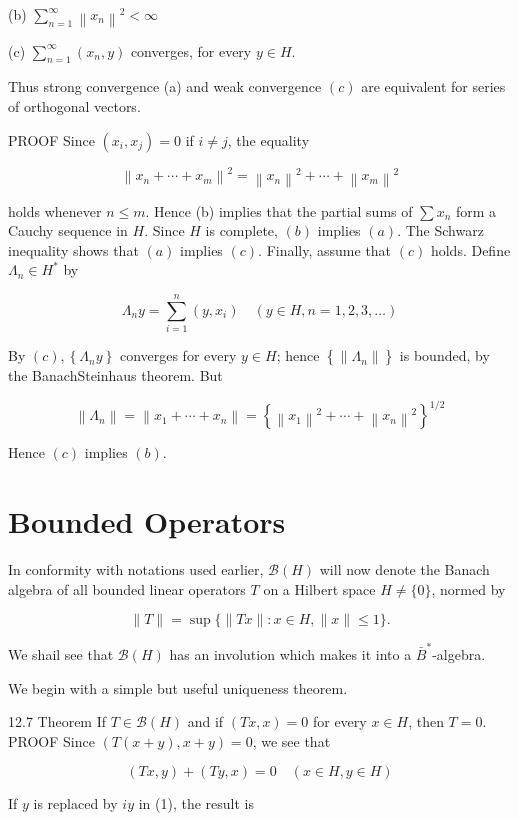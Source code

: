 \documentclass[10pt]{article}
\begin{document}
(b) $\sum_{n=1}^{\infty}\left\|x_{n}\right\|^{2}<\infty$

(c) $\sum_{n=1}^{\infty}\left(x_{n}, y\right)$ converges, for every $y \in H$.

Thus strong convergence (a) and weak convergence $(c)$ are equivalent for series of orthogonal vectors.

PROOF Since $\left(x_{i}, x_{j}\right)=0$ if $i \neq j$, the equality

$$
\left\|x_{n}+\cdots+x_{m}\right\|^{2}=\left\|x_{n}\right\|^{2}+\cdots+\left\|x_{m}\right\|^{2}
$$

holds whenever $n \leq m$. Hence (b) implies that the partial sums of $\sum x_{n}$ form a Cauchy sequence in $H$. Since $H$ is complete, $(b)$ implies $(a)$. The Schwarz inequality shows that $(a)$ implies $(c)$. Finally, assume that $(c)$ holds. Define $\Lambda_{n} \in H^{*}$ by

$$
\Lambda_{n} y=\sum_{i=1}^{n}\left(y, x_{i}\right) \quad(y \in H, n=1,2,3, \ldots)
$$

By $(c),\left\{\Lambda_{n} y\right\}$ converges for every $y \in H$; hence $\left\{\left\|\Lambda_{n}\right\|\right\}$ is bounded, by the BanachSteinhaus theorem. But

$$
\left\|\Lambda_{n}\right\|=\left\|x_{1}+\cdots+x_{n}\right\|=\left\{\left\|x_{1}\right\|^{2}+\cdots+\left\|x_{n}\right\|^{2}\right\}^{1 / 2}
$$

Hence $(c)$ implies $(b)$.

\section{Bounded Operators}
In conformity with notations used earlier, $\mathscr{B}(H)$ will now denote the Banach algebra of all bounded linear operators $T$ on a Hilbert space $H \neq\{0\}$, normed by

$$
\|T\|=\sup \{\|T x\|: x \in H,\|x\| \leq 1\} .
$$

We shail see that $\mathscr{\mathscr { B }}(H)$ has an involution which makes it into a $\bar{B}^{*}$-algebra.

We begin with a simple but useful uniqueness theorem.

12.7 Theorem If $T \in \mathscr{B}(H)$ and if $(T x, x)=0$ for every $x \in H$, then $T=0$. PROOF Since $(T(x+y), x+y)=0$, we see that

$$
(T x, y)+(T y, x)=0 \quad(x \in H, y \in H)
$$

If $y$ is replaced by $i y$ in (1), the result is
\end{document}
